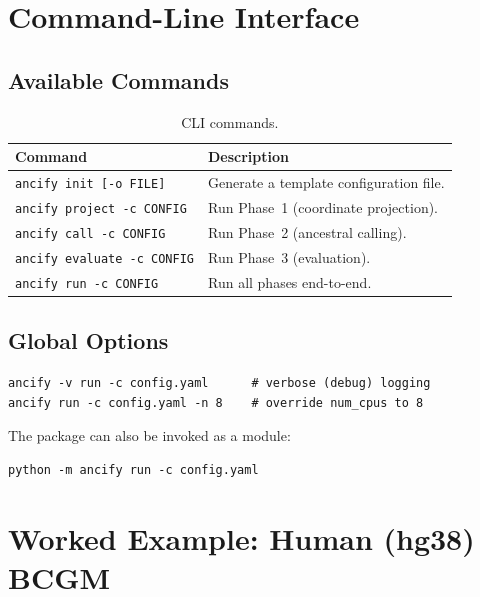 \documentclass[11pt,a4paper]{article}
\begin{document}
\section{Command-Line Interface}
\label{sec:cli}

\subsection{Available Commands}

\begin{table}[H]
\centering
\caption{CLI commands.}
\begin{tabular}{lp{9cm}}
\toprule
\textbf{Command} & \textbf{Description} \\
\midrule
\texttt{ancify init [-o FILE]} & Generate a template configuration file. \\
\texttt{ancify project -c CONFIG} & Run Phase~1 (coordinate projection). \\
\texttt{ancify call -c CONFIG} & Run Phase~2 (ancestral calling). \\
\texttt{ancify evaluate -c CONFIG} & Run Phase~3 (evaluation). \\
\texttt{ancify run -c CONFIG} & Run all phases end-to-end. \\
\bottomrule
\end{tabular}
\end{table}

\subsection{Global Options}

\begin{lstlisting}[style=bashstyle]
ancify -v run -c config.yaml      # verbose (debug) logging
ancify run -c config.yaml -n 8    # override num_cpus to 8
\end{lstlisting}

The package can also be invoked as a module:
\begin{lstlisting}[style=bashstyle]
python -m ancify run -c config.yaml
\end{lstlisting}


\section{Worked Example: Human (hg38) BCGM}
\label{sec:example_human}
\end{document}
